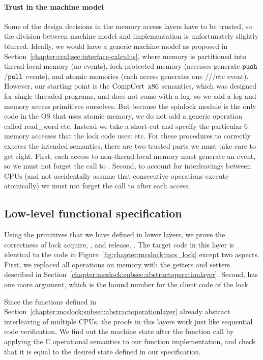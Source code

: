\paragraph{Trust in the machine model}
Some of the design decisions in the memory access
layers have to be trusted, so the division between machine model and
implementation is unfortunately slightly blurred.
Ideally, we would have a generic machine model as proposed in Section~\ref{chapter:ccal:sec:interface-calculus}, where memory is partitioned into thread-local
memory (no events), lock-protected memory (accesses generate ${\mathrm{\texttt{push}}}$/${\mathrm{\texttt{pull}}}$
events), and atomic memories (each access
generates one ///etc event).  However, our starting point
is the $\mathrm{CompCert}$ $\mathrm{x86}$ semantics, which was designed for single-threaded
programs, and does not come with a log, so we add a log and memory access
primitives ourselves.
But because the spinlock module is the only code in the OS that uses
atomic memory, we do not add a generic operation called
read\_word etc. Instead we take a short-cut and specify the particular
6 memory accesses that the lock code uses:  etc.
For these procedures to correctly express the intended semantics,
there are two trusted parts we must take care to get right. First,
each access to non-thread-local memory must generate an event, so we
must not forget the call to
. 
Second, to account for
interleavings between CPUs (and not accidentally assume that consecutive
operations execute atomically) we must not forget the call to
 after each access.


\subsection{Low-level functional specification}
\label{chapter:mcslock:subsec:atomicoperation}

Using the primitives that we have defined in lower layers, we prove the correctness of lock acquire, , and release, .
The target code in this layer is identical to the code in Figure~\ref{fig:chapter:mcslock:mcs_lock} except two aspects. 
First, we replaced all operations on memory with the getters and setters described in Section~\ref{chapter:mcslock:subsec:abstractoperationlayer}.
Second,  has one more
 argument, which is the bound number for the client code of the lock.

Since the functions defined in
Section~\ref{chapter:mcslock:subsec:abstractoperationlayer} already abstract interleaving
of multiple CPUs, the proofs in this layers work just like sequential
code verification. We find out the machine state after the function
call by applying the C operational semantics to our function
implementation, and check that it is equal to the desired state
defined in our specification.


